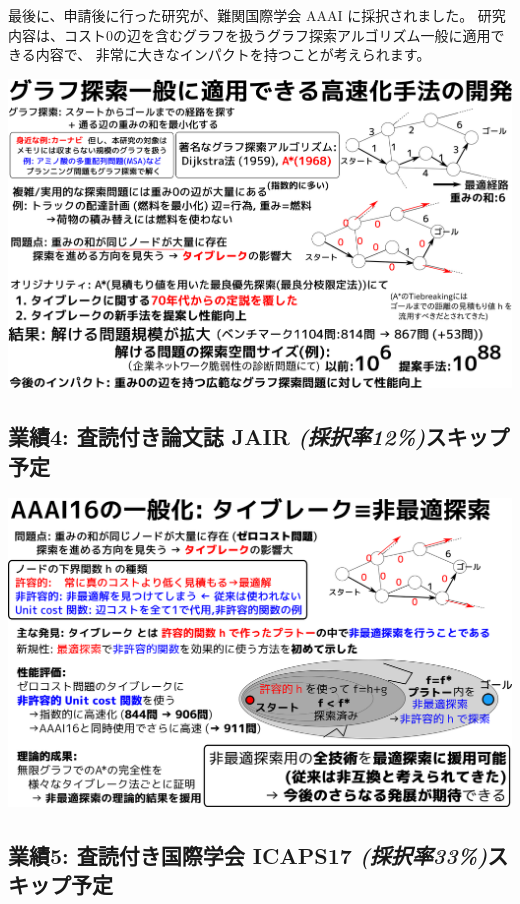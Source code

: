 \begin{resume}
最後に、申請後に行った研究が、難関国際学会 AAAI に採択されました。
研究内容は、コスト0の辺を含むグラフを扱うグラフ探索アルゴリズム一般に適用できる内容で、
非常に大きなインパクトを持つことが考えられます。
\end{resume}

\includegraphics{img/aaai16.png}

\subsection[業績4: 査読付き論文誌 JAIR \textbf{\emph{(採択率12\%)}}]{業績4: 査読付き論文誌 JAIR \textbf{\emph{(採択率12\%)}}\hfill{}\textsc{スキップ予定}}
\label{sec-1-9}

\begin{resume}
\end{resume}

\includegraphics{img/jair17.png}

\subsection[業績5: 査読付き国際学会 ICAPS17 \textbf{\emph{(採択率33\%)}}]{業績5: 査読付き国際学会 ICAPS17 \textbf{\emph{(採択率33\%)}}\hfill{}\textsc{スキップ予定}}
\label{sec-1-10}


